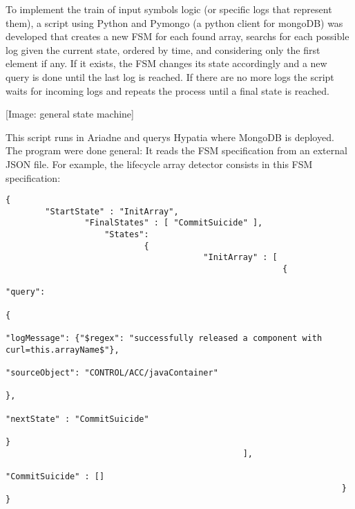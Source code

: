 \documentclass[]{spie}  %
\begin{document}
To implement the train of input symbols logic (or specific logs that represent
        them), a script using Python and Pymongo (a python client for mongoDB)
    was developed that creates a new FSM for each found array, searchs for each
    possible log given the current state, ordered by time, and considering only
    the first element if any. If it exists, the FSM changes its state
    accordingly and a new query is done until the last log is reached. If there
    are no more logs the script waits for incoming logs and repeats the process
    until a final state is reached.

[Image: general state machine]

This script runs in Ariadne and querys Hypatia where MongoDB is deployed. The
program were done general: It reads the FSM specification from an external JSON
file. For example, the lifecycle array detector consists in this FSM
specification:
\begin{verbatim}
{
        "StartState" : "InitArray",
                "FinalStates" : [ "CommitSuicide" ],
                    "States":
                            {
                                        "InitArray" : [
                                                        {
                                                                            "query":
                                                                                                {
                                                                                                                        "logMessage": {"$regex": "successfully released a component with curl=this.arrayName$"},
                                                                                                                                            "sourceObject": "CONTROL/ACC/javaContainer"
                                                                                                                                                                },
                                                                                            "nextState" : "CommitSuicide"
                                                                                                            }
                                                ],
                                                            "CommitSuicide" : []
                                                                    }
}

\end{verbatim}
\end{document}
